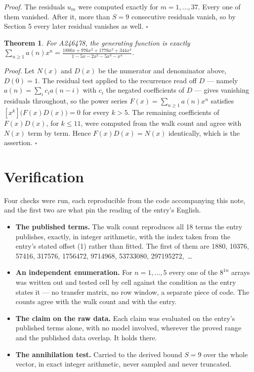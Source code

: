 \documentclass[11pt]{article}
\newtheorem{theorem}{Theorem}
\theoremstyle{definition}
\begin{document}
{\itshape Proof.} The residuals $u_m$ were computed exactly for $m = 1,\dots,37$. Every one of them vanished. After it, more than $S = 9$ consecutive residuals vanish, so by Section 5 every later residual vanishes as well. $\square$

\begin{theorem} For A246478, the generating function is exactly $\sum_{n\ge 1} a(n)x^n = \frac{1880x + 976x^{2} + 1776x^{3} + 344x^{4}}{1 - 5x - 2x^{2} - 5x^{3} - x^{4}}$.\end{theorem}

{\itshape Proof.} Let $N(x)$ and $D(x)$ be the numerator and denominator above, $D(0)=1$. The residual test applied to the recurrence read off $D$ --- namely $a(n) = \sum_i c_i a(n-i)$ with $c_i$ the negated coefficients of $D$ --- gives vanishing residuals throughout, so the power series $F(x)=\sum_{n\ge 1}a(n)x^n$ satisfies $[x^k]\bigl(F(x)D(x)\bigr) = 0$ for every $k > 5$. The remaining coefficients of $F(x)D(x)$, for $k \le 11$, were computed from the walk count and agree with $N(x)$ term by term. Hence $F(x)D(x) = N(x)$ identically, which is the assertion. $\square$

\section{Verification}

Four checks were run, each reproducible from the code accompanying this note, and the first two are what pin the reading of the entry's English.

\begin{itemize}

\item {\bfseries The published terms.} The walk count reproduces all 18 terms the entry publishes, exactly, in integer arithmetic, with the index taken from the entry's stated offset (1) rather than fitted. The first of them are 1880, 10376, 57416, 317576, 1756472, 9714968, 53733080, 297195272,~\dots

\item {\bfseries An independent enumeration.} For $n = 1,\dots,5$ every one of the $8^{1n}$ arrays was written out and tested cell by cell against the condition as the entry states it --- no transfer matrix, no row window, a separate piece of code. The counts agree with the walk count and with the entry.

\item {\bfseries The claim on the raw data.} Each claim was evaluated on the entry's published terms alone, with no model involved, wherever the proved range and the published data overlap. It holds there.

\item {\bfseries The annihilation test.} Carried to the derived bound $S = 9$ over the whole vector, in exact integer arithmetic, never sampled and never truncated.

\end{itemize}
\end{document}

